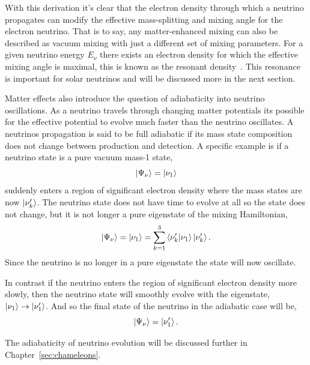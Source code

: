 With this derivation it's clear that the electron density through which a
neutrino propagates can modify the effective mass-splitting and mixing angle
for the electron neutrino.
That is to say, any matter-enhanced mixing can also be described as vacuum mixing
with just a different set of mixing parameters.
For a given neutrino energy $E_{\nu}$ there exists an electron density for which
the effective mixing angle is maximal, this is known as the resonant density~\citep{wolfenstein_osc, ms_oscillation}.
This resonance is important for solar neutrinos and will be discussed more in
the next section.

Matter effects also introduce the question of adiabaticity into neutrino
oscillations.
As a neutrino travels through changing matter potentials its possible for
the effective potential to evolve much faster than the neutrino oscillates.
A neutrinos propagation is said to be full adiabatic if its mass state composition
does not change between production and detection.
A specific example is if a neutrino state is a pure vacuum mass-1
state,
\begin{equation*}
    \ket{\Psi_{\nu}} = \ket{\nu_{1}}
\end{equation*}
suddenly enters a region of significant electron density where the mass states
are now $\ket{\nu_{k}^\prime}$.
The neutrino state does not have time to evolve at all so the state
does not change, but it is not longer a pure eigenstate of the mixing
Hamiltonian,
\begin{equation*}
    \ket{\Psi_{\nu}} = \ket{\nu_{1}} = \sum_{k=1}^{3} \braket{\nu_{k}^\prime}{\nu_{1}}\ket{\nu_{k}^\prime}\text{.}
\end{equation*}
Since the neutrino is no longer in a pure eigenstate the state will
now oscillate.

In contrast if the neutrino enters the region of significant electron
density more slowly, then the neutrino state will smoothly evolve with the
eigenstate, $\ket{\nu_{1}} \rightarrow \ket{\nu_{1}^{\prime}}$.
And so the final state of the neutrino in the adiabatic case will be,
\begin{equation*}
    \ket{\Psi_{\nu}} = \ket{\nu_{1}^{\prime}}\text{.}
\end{equation*}

The adiabaticity of neutrino evolution will be discussed further in
Chapter~\ref{sec:chameleons}.

